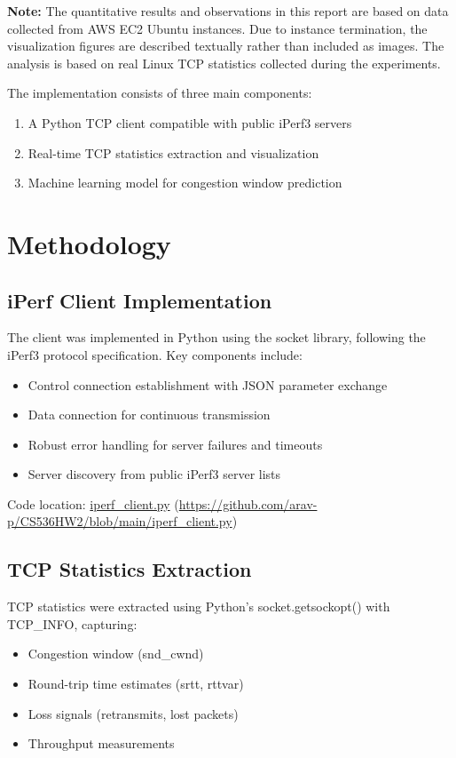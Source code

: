 \documentclass[11pt]{article}
\begin{document}
\textbf{Note:} The quantitative results and observations in this report are based on data collected from AWS EC2 Ubuntu instances. Due to instance termination, the visualization figures are described textually rather than included as images. The analysis is based on real Linux TCP statistics collected during the experiments.

The implementation consists of three main components:
\begin{enumerate}
    \item A Python TCP client compatible with public iPerf3 servers
    \item Real-time TCP statistics extraction and visualization
    \item Machine learning model for congestion window prediction
\end{enumerate}

\section{Methodology}

\subsection{iPerf Client Implementation}

The client was implemented in Python using the socket library, following the iPerf3 protocol specification. Key components include:

\begin{itemize}
    \item Control connection establishment with JSON parameter exchange
    \item Data connection for continuous transmission
    \item Robust error handling for server failures and timeouts
    \item Server discovery from public iPerf3 server lists
\end{itemize}

Code location: \href{https://github.com/arav-p/CS536HW2/blob/main/iperf_client.py}{iperf\_client.py} (\url{https://github.com/arav-p/CS536HW2/blob/main/iperf_client.py})

\subsection{TCP Statistics Extraction}

TCP statistics were extracted using Python's socket.getsockopt() with TCP\_INFO, capturing:
\begin{itemize}
    \item Congestion window (snd\_cwnd)
    \item Round-trip time estimates (srtt, rttvar)
    \item Loss signals (retransmits, lost packets)
    \item Throughput measurements
\end{itemize}
\end{document}
